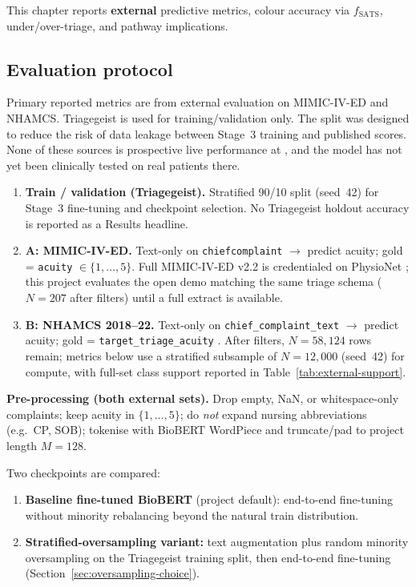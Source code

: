 This chapter reports \textbf{external} predictive metrics, colour accuracy via \(f_{\mathrm{SATS}}\), under/over-triage, and pathway implications.

\subsection{Evaluation protocol}
\label{sec:eval-protocol}

Primary reported metrics are from external evaluation on MIMIC-IV-ED and NHAMCS. Triagegeist is used for training/validation only. The split was designed to reduce the risk of data leakage between Stage~3 training and published scores. None of these sources is prospective live performance at \examplehospital{}, and the model has not yet been clinically tested on real patients there.

\begin{enumerate}
\item \textbf{Train / validation (Triagegeist).} Stratified 90/10 split (seed~42) for Stage~3 fine-tuning and checkpoint selection. No Triagegeist holdout accuracy is reported as a Results headline.
\item \textbf{A: MIMIC-IV-ED.} Text-only on \texttt{chiefcomplaint} \(\rightarrow\) predict acuity; gold = \texttt{acuity} \(\in\{1,\ldots,5\}\). Full MIMIC-IV-ED v2.2 is credentialed on PhysioNet \citep{mimicived2023}; this project evaluates the open demo matching the same triage schema \citep{mimiciveddemo2023} (\(N=207\) after filters) until a full extract is available.
\item \textbf{B: NHAMCS 2018--22.} Text-only on \texttt{chief\_complaint\_text} \(\rightarrow\) predict acuity; gold = \texttt{target\_triage\_acuity} \citep{nhamcs201822}. After filters, \(N=58{,}124\) rows remain; metrics below use a stratified subsample of \(N=12{,}000\) (seed~42) for compute, with full-set class support reported in Table~\ref{tab:external-support}.
\end{enumerate}

\textbf{Pre-processing (both external sets).} Drop empty, NaN, or whitespace-only complaints; keep acuity in \(\{1,\ldots,5\}\); do \emph{not} expand nursing abbreviations (e.g.\ CP, SOB); tokenise with BioBERT WordPiece and truncate/pad to project length \(M=128\).

Two checkpoints are compared:

\begin{enumerate}
\item \textbf{Baseline fine-tuned BioBERT} (project default): end-to-end fine-tuning without minority rebalancing beyond the natural train distribution.
\item \textbf{Stratified-oversampling variant:} text augmentation plus random minority oversampling on the Triagegeist training split, then end-to-end fine-tuning (Section~\ref{sec:oversampling-choice}).
\end{enumerate}


